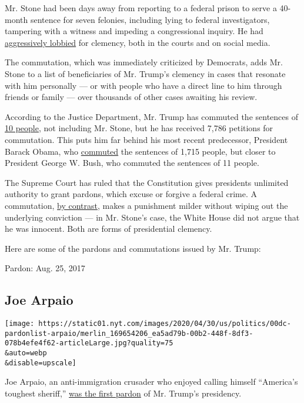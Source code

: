 Mr. Stone had been days away from reporting to a federal prison to serve
a 40-month sentence for seven felonies, including lying to federal
investigators, tampering with a witness and impeding a congressional
inquiry. He had
\href{https://www.nytimes.com/2020/06/26/us/politics/roger-stone-prison.html}{aggressively
lobbied} for clemency, both in the courts and on social media.

The commutation, which was immediately criticized by Democrats, adds Mr.
Stone to a list of beneficiaries of Mr. Trump's clemency in cases that
resonate with him personally --- or with people who have a direct line
to him through friends or family --- over thousands of other cases
awaiting his review.

According to the Justice Department, Mr. Trump has commuted the
sentences of
\href{https://www.justice.gov/pardon/commutations-granted-president-donald-trump-2017-present}{10
people}, not including Mr. Stone, but he has received 7,786 petitions
for commutation. This puts him far behind his most recent predecessor,
President Barack Obama, who
\href{https://www.justice.gov/pardon/clemency-statistics\#obama}{commuted}
the sentences of 1,715 people, but closer to President George W. Bush,
who commuted the sentences of 11 people.

The Supreme Court has ruled that the Constitution gives presidents
unlimited authority to grant pardons, which excuse or forgive a federal
crime. A commutation,
\href{https://www.nytimes.com/2007/07/03/washington/03commute.html}{by
contrast}, makes a punishment milder without wiping out the underlying
conviction --- in Mr. Stone's case, the White House did not argue that
he was innocent. Both are forms of presidential clemency.

Here are some of the pardons and commutations issued by Mr. Trump:

Pardon: Aug. 25, 2017

\hypertarget{joe-arpaio}{%
\subsection{Joe Arpaio}\label{joe-arpaio}}

\texttt{[image: https://static01.nyt.com/images/2020/04/30/us/politics/00dc-pardonlist-arpaio/merlin\_169654206\_ea5ad79b-00b2-448f-8df3-078b4efe4f62-articleLarge.jpg?quality=75\\\&auto=webp\\\&disable=upscale]}

Joe Arpaio, an anti-immigration crusader who enjoyed calling himself
``America's toughest sheriff,''
\href{https://www.nytimes.com/2017/08/27/us/joe-arpaio-sheriff-pardon.html}{was
the first pardon} of Mr. Trump's presidency.

